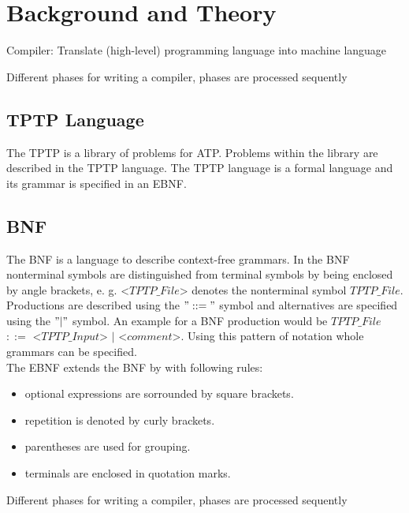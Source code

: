 
\chapter{Background and Theory}\label{cha:Background}

\cite{Mogensen.2017}
Compiler: Translate (high-level) programming language into machine language

Different phases for writing a compiler, phases are processed sequently
\section{TPTP Language}\label{sec:BackgroundTPTP}
The \acf{TPTP} is a library of problems for \ac{ATP}.
Problems within the library are described in the \ac{TPTP} language.
The  \ac{TPTP} language is a formal language and its grammar is specified in an \ac{EBNF}. \cite{Sut17}\\

\section{\acf{BNF}}\label{sec:BackgroundBNF}
The  \acf{BNF} is a language to describe context-free grammars.
In the \acf{BNF} nonterminal symbols are distinguished from terminal symbols by being enclosed by  angle brackets, e. g. <$TPTP\_File$> denotes the nonterminal symbol $TPTP\_File$.
Productions are described using the $"::="$ symbol and alternatives are specified using the $"|"$ symbol. \cite{BNF.1964} 
An example for a \ac{BNF} production would be $TPTP\_File$ $::=$ <$TPTP\_Input$> $|$ <$comment$>.
Using this pattern of notation whole grammars can be specified.\\
The \ac{EBNF} extends the \ac{BNF} by with following rules:

\begin{itemize}%
	\item optional expressions are sorrounded by square brackets.
	\item repetition is denoted by curly brackets.
	\item parentheses are used for grouping.
	\item terminals are enclosed in quotation marks.
\end{itemize}
\label{itemize:BackgroundBNF}
\cite{EBNF.1977}


Different phases for writing a compiler, phases are processed sequently

